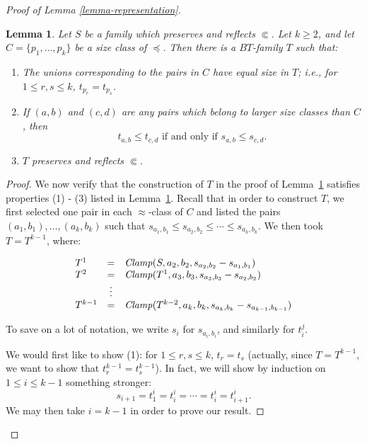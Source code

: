 \documentclass[letterpaper]{article}
\newtheorem{lemma}[theorem]{Lemma}
\theoremstyle{definition}
\newcommand{\set}[1]{\{ #1 \}}
\newcommand{\Clamp}{\protect{\mbox{\textit{Clamp}}}}
\newcommand{\precsubseteq}{\Subset}
\begin{document}
\begin{proof}[Proof of Lemma \ref{lemma-representation}]
\begin{lemma}
Let $S$ be a family which preserves and reflects $\precsubseteq$.  Let $k\geq 2$, and let $C = \set{p_1, \ldots, p_k}$ be a size class of  $\preceq$.  Then there is a $BT$-family $T$ such that: 

\begin{enumerate}
    \item The unions corresponding to the pairs in $C$ have equal size in $T$; i.e., for $1\leq r,s \leq k$, $t_{p_r} = t_{p_s}$.
    
    \item If $(a,b)$ and $(c,d)$ are any pairs 
    which belong to larger size classes than $C$,
    then 
    \[ \mbox{$t_{a,b} \leq t_{c,d} $ if and only if $s_{a,b} \leq s_{c,d} $}.\]
    
    \item $T$ preserves and reflects $\precsubseteq$. 
\label{equalize2}
\end{enumerate}

\label{lemma-equalizing}
\end{lemma}
\begin{proof}
We now verify that the construction of $T$ in the proof of Lemma~\ref{lemma-equalizing} satisfies properties (1) - (3) listed in Lemma~\ref{lemma-equalizing}.
Recall that in order to construct $T$, we first selected one pair in each $\approx$-class of $C$ and listed the pairs $(a_1, b_1), \ldots, (a_k, b_k)$ such that $s_{a_1, b_1} \leq s_{a_2, b_2} \leq \cdots \leq s_{a_k, b_k}$.  We then took $T = T^{k-1}$, where:

\[ \begin{array}{lcl}
 T^1  & = &  \Clamp(S,a_2,b_2,s_{a_2, b_2} - s_{a_1, b_1})\\
T^2 & = & \Clamp(T^1,a_3, b_3, s_{a_3, b_3} - s_{a_2, b_2} )\\
  & \vdots   & \\
T^{k-1} & = & \Clamp(T^{k-2},a_k,b_k,
s_{a_k, b_k} - s_{a_{k-1}, b_{k-1}})\\
\end{array}
\]

To save on a lot of notation, we write $s_i$ for $s_{a_i, b_i}$,
and similarly for $t^j_i$.

We would first like to show (1): for $1 \leq r, s \leq k$, $t_{r} = t_{s}$ (actually, since $T = T^{k-1}$, we want to show that $t^{k-1}_{r} = t^{k-1}_{s}$).  In fact, we will show by induction on $1 \leq i \leq k - 1$ something stronger:
\begin{equation}
\label{equalization}
s_{i+1}  = t^i_{1} = t^i_{i} = \cdots = t^i_{i} =  t^i_{i+1}.
\end{equation}
We may then take $i = k - 1$ in order to prove our result.    


\end{proof}
\end{proof}
\end{document}
